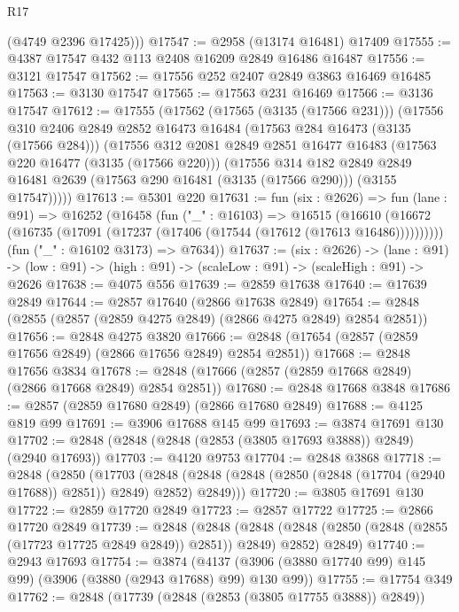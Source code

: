 \begin{lexlean}{R17}
\begin{coremodule}
        (@4749 @2396 @17425)))
@17547 := @2958 (@13174 @16481) @17409
@17555 := @4387 @17547 @432 @113 @2408 @16209 @2849 @16486 @16487
@17556 := @3121 @17547
@17562 := @17556 @252 @2407 @2849 @3863 @16469 @16485
@17563 := @3130 @17547
@17565 := @17563 @231 @16469
@17566 := @3136 @17547
@17612 := @17555
    (@17562
      (@17565 (@3135 (@17566 @231)))
      (@17556
        @310
        @2406
        @2849
        @2852
        @16473
        @16484
        (@17563 @284 @16473 (@3135 (@17566 @284)))
        (@17556
          @312
          @2081
          @2849
          @2851
          @16477
          @16483
          (@17563 @220 @16477 (@3135 (@17566 @220)))
          (@17556
            @314
            @182
            @2849
            @2849
            @16481
            @2639
            (@17563 @290 @16481 (@3135 (@17566 @290)))
            (@3155 @17547)))))
@17613 := @5301 @220
@17631 := fun (six : @2626) =>
  fun (lane : @91) =>
  @16252
    (@16458
      (fun ("_" : @16103) =>
      @16515
        (@16610 (@16672 (@16735 (@17091 (@17237 (@17406 (@17544 (@17612 (@17613 @16486))))))))))
      (fun ("_" : @16102 @3173) => @7634))
@17637 := (six : @2626) ->
  (lane : @91) -> (low : @91) -> (high : @91) -> (scaleLow : @91) -> (scaleHigh : @91) -> @2626
@17638 := @4075 @556
@17639 := @2859 @17638
@17640 := @17639 @2849
@17644 := @2857 @17640 (@2866 @17638 @2849)
@17654 := @2848 (@2855 (@2857 (@2859 @4275 @2849) (@2866 @4275 @2849) @2854 @2851))
@17656 := @2848 @4275 @3820
@17666 := @2848 (@17654 (@2857 (@2859 @17656 @2849) (@2866 @17656 @2849) @2854 @2851))
@17668 := @2848 @17656 @3834
@17678 := @2848 (@17666 (@2857 (@2859 @17668 @2849) (@2866 @17668 @2849) @2854 @2851))
@17680 := @2848 @17668 @3848
@17686 := @2857 (@2859 @17680 @2849) (@2866 @17680 @2849)
@17688 := @4125 @819 @99
@17691 := @3906 @17688 @145 @99
@17693 := @3874 @17691 @130
@17702 := @2848 (@2848 (@2848 (@2853 (@3805 @17693 @3888)) @2849) (@2940 @17693))
@17703 := @4120 @9753
@17704 := @2848 @3868
@17718 := @2848
    (@2850
      (@17703
        (@2848 (@2848 (@2848 (@2850 (@2848 (@17704 (@2940 @17688)) @2851)) @2849) @2852) @2849)))
@17720 := @3805 @17691 @130
@17722 := @2859 @17720 @2849
@17723 := @2857 @17722
@17725 := @2866 @17720 @2849
@17739 := @2848
    (@2848
      (@2848 (@2848 (@2850 (@2848 (@2855 (@17723 @17725 @2849 @2849)) @2851)) @2849) @2852)
      @2849)
@17740 := @2943 @17693
@17754 := @3874
    (@4137 (@3906 (@3880 @17740 @99) @145 @99) (@3906 (@3880 (@2943 @17688) @99) @130 @99))
@17755 := @17754 @349
@17762 := @2848 (@17739 (@2848 (@2853 (@3805 @17755 @3888)) @2849))

\end{coremodule}
\end{lexlean}
